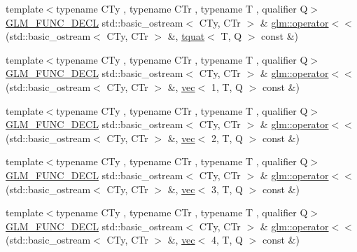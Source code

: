 \begin{DoxyCompactItemize}
\item 
{\footnotesize template$<$typename C\+Ty , typename C\+Tr , typename T , qualifier Q$>$ }\\\hyperlink{setup_8hpp_ab2d052de21a70539923e9bcbf6e83a51}{G\+L\+M\+\_\+\+F\+U\+N\+C\+\_\+\+D\+E\+CL} std\+::basic\+\_\+ostream$<$ C\+Ty, C\+Tr $>$ \& \hyperlink{group__gtx__io_ga0d49970be1b7cdc10a2b027cea97c7e3}{glm\+::operator$<$$<$} (std\+::basic\+\_\+ostream$<$ C\+Ty, C\+Tr $>$ \&, \hyperlink{structglm_1_1tquat}{tquat}$<$ T, Q $>$ const \&)
\item 
{\footnotesize template$<$typename C\+Ty , typename C\+Tr , typename T , qualifier Q$>$ }\\\hyperlink{setup_8hpp_ab2d052de21a70539923e9bcbf6e83a51}{G\+L\+M\+\_\+\+F\+U\+N\+C\+\_\+\+D\+E\+CL} std\+::basic\+\_\+ostream$<$ C\+Ty, C\+Tr $>$ \& \hyperlink{group__gtx__io_ga7a029530f08d465cd95b60186c625aba}{glm\+::operator$<$$<$} (std\+::basic\+\_\+ostream$<$ C\+Ty, C\+Tr $>$ \&, \hyperlink{structglm_1_1vec}{vec}$<$ 1, T, Q $>$ const \&)
\item 
{\footnotesize template$<$typename C\+Ty , typename C\+Tr , typename T , qualifier Q$>$ }\\\hyperlink{setup_8hpp_ab2d052de21a70539923e9bcbf6e83a51}{G\+L\+M\+\_\+\+F\+U\+N\+C\+\_\+\+D\+E\+CL} std\+::basic\+\_\+ostream$<$ C\+Ty, C\+Tr $>$ \& \hyperlink{group__gtx__io_ga164ed8df8315066e091df1987617f188}{glm\+::operator$<$$<$} (std\+::basic\+\_\+ostream$<$ C\+Ty, C\+Tr $>$ \&, \hyperlink{structglm_1_1vec}{vec}$<$ 2, T, Q $>$ const \&)
\item 
{\footnotesize template$<$typename C\+Ty , typename C\+Tr , typename T , qualifier Q$>$ }\\\hyperlink{setup_8hpp_ab2d052de21a70539923e9bcbf6e83a51}{G\+L\+M\+\_\+\+F\+U\+N\+C\+\_\+\+D\+E\+CL} std\+::basic\+\_\+ostream$<$ C\+Ty, C\+Tr $>$ \& \hyperlink{group__gtx__io_ga367fccf3eb4c54a7624e628b6131e76d}{glm\+::operator$<$$<$} (std\+::basic\+\_\+ostream$<$ C\+Ty, C\+Tr $>$ \&, \hyperlink{structglm_1_1vec}{vec}$<$ 3, T, Q $>$ const \&)
\item 
{\footnotesize template$<$typename C\+Ty , typename C\+Tr , typename T , qualifier Q$>$ }\\\hyperlink{setup_8hpp_ab2d052de21a70539923e9bcbf6e83a51}{G\+L\+M\+\_\+\+F\+U\+N\+C\+\_\+\+D\+E\+CL} std\+::basic\+\_\+ostream$<$ C\+Ty, C\+Tr $>$ \& \hyperlink{group__gtx__io_ga6ce60b96203d549182f4df029007fb94}{glm\+::operator$<$$<$} (std\+::basic\+\_\+ostream$<$ C\+Ty, C\+Tr $>$ \&, \hyperlink{structglm_1_1vec}{vec}$<$ 4, T, Q $>$ const \&)

\end{DoxyCompactItemize}

